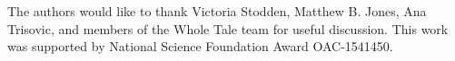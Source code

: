 
\begin{acks}
The authors would like to thank Victoria Stodden, Matthew B. Jones,
Ana Trisovic, and members of the Whole Tale team for useful discussion.
This work was supported by National Science Foundation Award OAC-1541450.
\end{acks}

